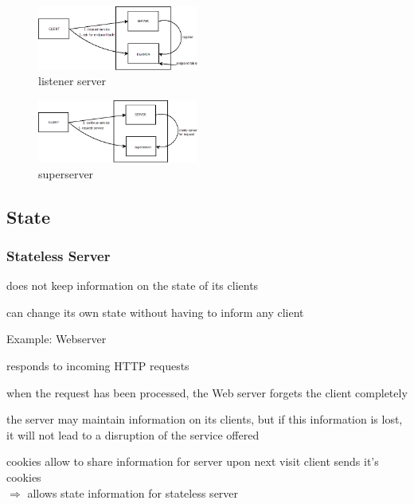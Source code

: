 \begin{minipage}{\linewidth}
      \centering
      \begin{minipage}{0.45\linewidth}
          \begin{figure}[H]
	\includegraphics[width=200px]{gfx/server_deamon.png}
	\caption{listener server}
	\label{img:listener}
          \end{figure}
      \end{minipage}
      \hspace{0.05\linewidth}
      \begin{minipage}{0.45\linewidth}
          \begin{figure}[H]
	\includegraphics[width=200px]{gfx/superserver.png}
	\caption{superserver}
	\label{img:supserv}
          \end{figure}
      \end{minipage}
\end{minipage}

\subsection{State}

\subsubsection{Stateless Server}

\begin{compactitem}
	\item does not keep information on the state of its clients
	\item can change its own state without having to inform any client
	\item Example: Webserver
	\begin{compactitem}
		\item responds to incoming HTTP requests
		\item when the request has been processed, the Web server forgets the client completely
	\end{compactitem}
	\item the server may maintain information on its clients, but if this information is lost, it will not lead to a disruption of the service offered
	\item cookies allow to share information for server upon next visit client sends it's cookies \\
	$\Rightarrow$ allows state information for stateless server
\end{compactitem}

